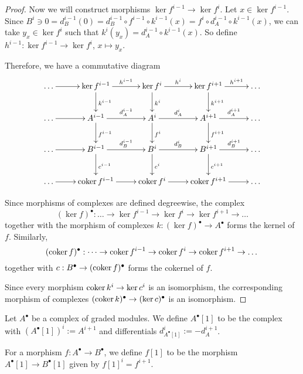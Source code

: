 \begin{proof}
    Now we will construct morphisms $\ker f^{i-1} \rightarrow \ker f^i$.
    Let $x \in \ker f^{i-1}$.
    Since $B^i \ni 0 = d^{i-1}_B(0) = d^{i-1}_B \circ f^{i-1} \circ k^{i-1} (x) = f^i \circ d^{i-1}_A \circ k^{i-1} (x)$, we can take $y_x \in \ker f^i$ such that $k^i(y_x) = d^{i-1}_A \circ k^{i-1} (x)$.
    So define $h^{i-1}: \ker f^{i-1} \rightarrow \ker f^i$, $x \mapsto y_x$.

    Therefore, we have a commutative diagram
    \[
        \xymatrix{
            \dots \ar[r] & \ker f^{i-1} \ar[r]^-{h^{i-1} }\ar[d]^{k^{i-1}} & \ker f^i \ar[r]^-{h^i} \ar[d]^{k^i} & \ker f^{i+1} \ar[r]^-{h^{i+1}} \ar[d]^{k^{i+1}} & \dots \\
            \dots \ar[r] & A^{i-1} \ar[r]^-{d^{i-1}_A} \ar[d]^{f^{i-1}} & A^i \ar[r]^-{d^i_A} \ar[d]^{f^i} & A^{i+1} \ar[r]^-{d^{i+1}_A} \ar[d]^{f^{i+1}} & \dots \\
            \dots \ar[r] & B^{i-1} \ar[r]^-{d^{i-1}_B} \ar[d]^{c^{i-1}} & B^i \ar[r]^-{d^i_B} \ar[d]^{c^i} & B^{i+1} \ar[r]^-{d^{i+1}_B} \ar[d]^{c^{i+1}} & \dots \\
            \dots \ar[r] & \coker f^{i-1} \ar[r] & \coker f^i \ar[r] & \coker f^{i+1} \ar[r] & \dots
        }
    \]

    Since morphisms of complexes are defined degreewise, the complex $$(\ker f)^\bullet: \dots \rightarrow \ker f^{i-1} \rightarrow \ker f^i \rightarrow \ker f^{i+1} \rightarrow \dots$$ together with the morphism of complexes $k: (\ker f)^\bullet \rightarrow A^\bullet$ forms the kernel of $f$.
    Similarly, $$(\operatorname{coker} f)^\bullet: \dots \rightarrow \operatorname{coker} f^{i-1} \rightarrow \operatorname{coker} f^i \rightarrow \operatorname{coker} f^{i+1} \rightarrow \dots$$ together with $c: B^\bullet \rightarrow (\operatorname{coker} f)^\bullet$ forms the cokernel of $f$.

    Since every morphism $\operatorname{coker} k^i \rightarrow \ker c^i$ is an isomorphism, the corresponding morphism of complexes $(\operatorname{coker} k)^\bullet \rightarrow (\ker c)^\bullet$ is an isomorphism.
\end{proof}

\begin{definition}
    Let $A^\bullet$ be a complex of graded modules.
    We define $A^\bullet[1]$ to be the complex with $(A^\bullet[1])^i := A^{i+1}$ and differentials $d^i_{A^\bullet[1]} := -d^{i+1}_A$.

    For a morphism $f: A^\bullet \rightarrow B^\bullet$, we define $f[1]$ to be the morphism $A^\bullet[1] \rightarrow B^\bullet[1]$ given by $f[1]^i = f^{i+1}$.
\end{definition}

